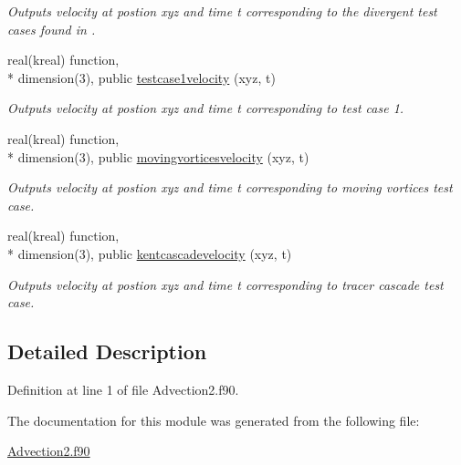 \begin{DoxyCompactItemize}
\begin{DoxyCompactList}\small\item\em Outputs velocity at postion xyz and time t corresponding to the divergent test cases found in \cite{LauritzenEtAl2012}. \end{DoxyCompactList}\item 
real(kreal) function, \\*
dimension(3), public \hyperlink{group__AdvectionRK4_gad30efb36915276cdc54a055b474d93d8}{testcase1velocity} (xyz, t)
\begin{DoxyCompactList}\small\item\em Outputs velocity at postion xyz and time t corresponding to \cite{WilliamsonEtAl1992} test case 1. \end{DoxyCompactList}\item 
real(kreal) function, \\*
dimension(3), public \hyperlink{group__AdvectionRK4_gaad6c3850042d085e15518e2cb9d8909f}{movingvorticesvelocity} (xyz, t)
\begin{DoxyCompactList}\small\item\em Outputs velocity at postion xyz and time t corresponding to \cite{NairJablonowski2008} moving vortices test case. \end{DoxyCompactList}\item 
real(kreal) function, \\*
dimension(3), public \hyperlink{group__AdvectionRK4_ga0001703c78ad97926664935bc766e15c}{kentcascadevelocity} (xyz, t)
\begin{DoxyCompactList}\small\item\em Outputs velocity at postion xyz and time t corresponding to \cite{KentEtAl2012} tracer cascade test case. \end{DoxyCompactList}\end{DoxyCompactItemize}


\subsection{Detailed Description}


Definition at line 1 of file Advection2.\+f90.



The documentation for this module was generated from the following file\+:\begin{DoxyCompactItemize}
\item 
\hyperlink{Advection2_8f90}{Advection2.\+f90}\end{DoxyCompactItemize}
